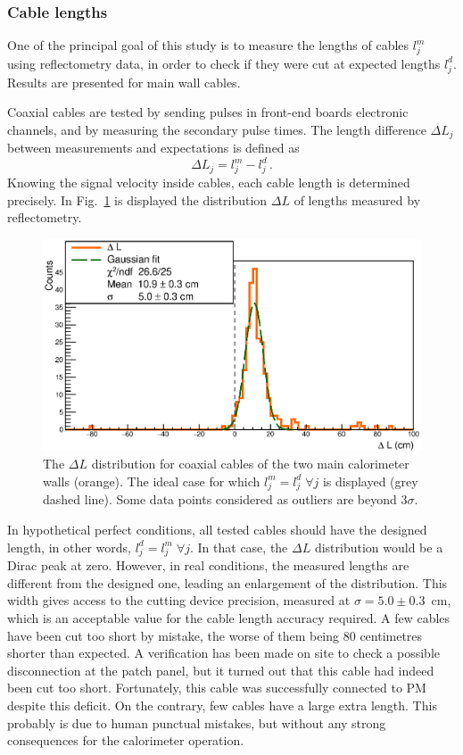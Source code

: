 \subsubsection*{Cable lengths}

One of the principal goal of this study is to measure the lengths of cables $l^{m}_{j}$ using reflectometry data, in order to check if they were cut at expected lengths $l^{d}_{j}$.
Results are presented for main wall cables.

Coaxial cables are tested by sending pulses in front-end boards electronic channels, and by measuring the secondary pulse times.
The length difference $\Delta L_{j}$ between measurements and expectations is defined as
\begin{equation}
  \Delta L_{j} = l^{m}_{j}-l^{d}_{j}\,.
\end{equation}
Knowing the signal velocity inside cables, each cable length is determined precisely.
In Fig.~\ref{fig:LengthDiff} is displayed the distribution $\Delta L$ of lengths measured by reflectometry.
\begin{figure}[h!]
  \centering
  \includegraphics[width=15cm]{commissioning/fig_commissioning/length_diff.eps}
  \caption{The $\Delta L$ distribution for coaxial cables of the two main calorimeter walls (orange).
    The ideal case for which $l^{m}_{j} = l^{d}_{j} \;\forall j$ is displayed (grey dashed line).
    Some data points considered as outliers are beyond $3\sigma$.
    \label{fig:LengthDiff}}
\end{figure}
In hypothetical perfect conditions, all tested cables should have the designed length, in other words, $l^{d}_{j} = l^{m}_{j} \;\forall j$.
In that case, the $\Delta L$ distribution would be a Dirac peak at zero.
However, in real conditions, the measured lengths are different from the designed one, leading an enlargement of the distribution.
This width gives access to the cutting device precision, measured at $\sigma=5.0\pm0.3$~cm, which is an acceptable value for the cable length accuracy required.
A few cables have been cut too short by mistake, the worse of them being $80$ centimetres shorter than expected.
A verification has been made on site to check a possible disconnection at the patch panel, but it turned out that this cable had indeed been cut too short.
Fortunately, this cable  was successfully connected to PM despite this deficit.
On the contrary, few cables have a large extra length.
This probably is due to human punctual mistakes, but without any strong consequences for the calorimeter operation.

